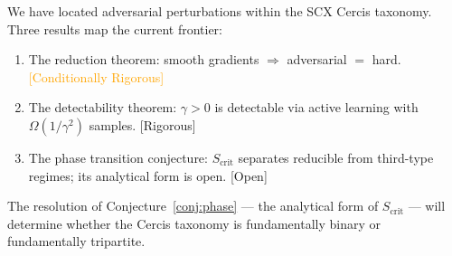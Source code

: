 \documentclass[12pt,a4paper]{article}
\newcommand{\rigorous}{\textcolor{green!50!black}{\small\textsf{[Rigorous]}}}
\newcommand{\conditionallyrigorous}{\textcolor{orange}{\small\textsf{[Conditionally Rigorous]}}}
\newcommand{\openquest}{\textcolor{red!70!black}{\small\textsf{[Open]}}}
\begin{document}
We have located adversarial perturbations within the SCX Cercis taxonomy.
Three results map the current frontier:
\begin{enumerate}[label=(\arabic*)]
    \item The reduction theorem: smooth gradients $\Rightarrow$ adversarial
          $=$ hard.  \conditionallyrigorous
    \item The detectability theorem: $\gamma > 0$ is detectable via active
          learning with $\Omega(1/\gamma^2)$ samples.  \rigorous
    \item The phase transition conjecture: $S_{\mathrm{crit}}$ separates
          reducible from third-type regimes; its analytical form is open.
          \openquest
\end{enumerate}

The resolution of Conjecture~\ref{conj:phase} — the analytical form of
$S_{\mathrm{crit}}$ — will determine whether the Cercis taxonomy is
fundamentally binary or fundamentally tripartite.
\end{document}
